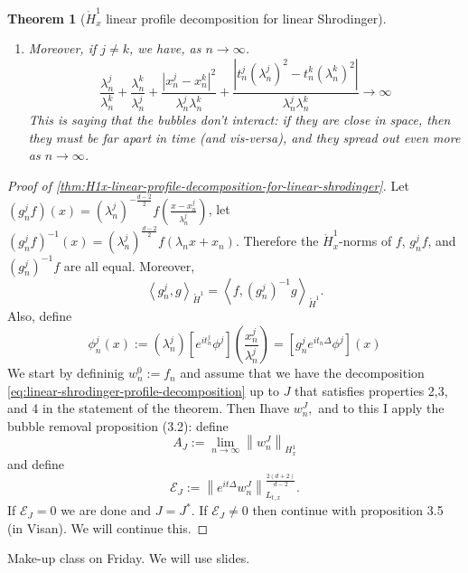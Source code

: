 \documentclass{article}
\newtheorem{theorem}{Theorem}
\newcommand\norm[1]{\left\lVert#1\right\rVert}
\begin{document}
\begin{theorem}[$\mathring{H}_x^1$ linear profile decomposition for linear Shrodinger]
\begin{enumerate}
    \begin{equation*}
      e^{-it_{n}^{J}}\left[ \left( \lambda_{n}^{J}
        \right)^{\frac{d-2}{2}}w_{n}^{J}(\lambda_{n}^{J}+x_{n}^{J})  \right]
      \rightharpoonup  0 \text{ weakly in }\mathring{H}^{1}
    \end{equation*}
    \item Moreover, if $j \neq k$,  we have, as $n \to \infty$.
    \begin{equation*} \frac{\lambda_{n}^{j}}{\lambda_{n}^{k}}+\frac{\lambda_{n}^{k}}{\lambda_{n}^{j}}+ \frac{\left| x_{n}^{j}-x_{n}^{k} \right|^{2}}{\lambda_{n}^{j}\lambda_{n}^{k}}+\frac{\left| t_{n}^{j}(\lambda_{n}^{j})^{2}-t_{n}^{k}(\lambda_{n}^{k})^{2} \right|}{\lambda_{n}^{j}\lambda_{n}^{k}} \to \infty
    \end{equation*}
    This is saying that the bubbles don't interact: if they are close in space,
    then they must be far apart in time (and vis-versa), and they spread out
    even more as $n \to\infty$. 
  \end{enumerate}
\end{theorem}
\begin{proof}[Proof of \cref{thm:H1x-linear-profile-decomposition-for-linear-shrodinger}]
  Let $(g_{n}^{j}f)(x)= \left( \lambda_{n}^{j} \right)^{-\frac{d-2}{2}}f \left(
    \frac{x-x_{n}^{j}}{\lambda_{n}^{j}} \right) $, let $(g^{j}_{n}f)^{-1}(x)=
  \left( \lambda_{n}^{j} \right)^{\frac{d-2}{2}}f(\lambda_{n}x+x_{n}) $.
  Therefore the $\mathring{H}_{x}^{1}$-norms of $f$, $g_{n}^{j}f $, and
  $(g_{n}^{j})^{-1}f$ are all equal. Moreover,
  \begin{equation*}
    \left\langle g_{n}^{j},g \right\rangle_{\mathring{H}^{1}} = \left\langle f, (g_{n}^{j})^{-1}g \right\rangle_{\mathring{H}^{1}}.
  \end{equation*}
  Also, define
  \begin{equation*}
    \phi^{j}_{n}(x):= \left( \lambda_{n}^{j} \right) \left[ e^{it_{n}^{j}}\phi^{j} \right] \left( \frac{x_{n}^{j}}{\lambda_{n}^{j}} \right)  = \left[ g_{n}^{j}e^{it_{n}\Delta}\phi^{j} \right] (x)
  \end{equation*}
  We start by defininig $w^{0}_{n}:=f_{n}$ and assume that we have the
  decomposition \cref{eq:linear-shrodinger-profile-decomposition} up to $J$ that
  satisfies properties 2,3, and 4 in the statement of the theorem. Then Ihave
  $w_{n}^{J},$ and to this I apply the bubble removal proposition (3.2): define
  \begin{equation*}
    A_{J} := \lim_{n\to\infty} \norm{w_{n}^{J}}_{H_{x}^{1}}
  \end{equation*}
  and define
  \begin{equation*}
    \mathcal{E}_{J}:= \norm{e^{it\Delta}w_{n}^{J}}_{L_{t,x}}^{\frac{2(d+2)}{d-2}}.
  \end{equation*}
  If $\mathcal{E}_{J}=0$ we are done and $J=J^{*}$. If $\mathcal{E}_{J} \neq 0$
  then continue with proposition 3.5 (in Visan). We will continue this. 
\end{proof}

Make-up class on Friday. We will use slides. 
\end{document}
